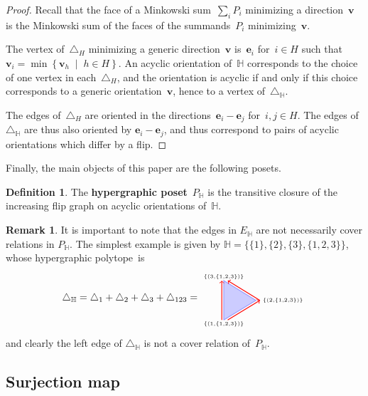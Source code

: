 \documentclass[reqno]{amsart}
\theoremstyle{definition}
\newtheorem{definition}[theorem]{Definition}
\newtheorem{remark}[theorem]{Remark}
\renewcommand{\b}[1]{\boldsymbol{#1}} %
\newcommand{\set}[2]{\left\{ #1 \;\middle|\; #2 \right\}} %
\newcommand{\simplex}{\triangle} %
\newcommand{\defn}[1]{\textbf{\textsf{\color{PineGreen} #1}}} %
\newcommand{\HH}{\mathbb H}  %
\begin{document}
\begin{proof}
Recall that the face of a Minkowski sum~$\sum_i P_i$ minimizing a direction~$\b{v}$ is the Minkowski sum of the faces of the summands~$P_i$ minimizing~$\b{v}$.

The vertex of~$\triangle_H$ minimizing a generic direction~$\b{v}$ is~$\b{e}_i$ for~$i \in H$ such that~$\b{v}_i = \min\set{\b{v}_h}{h \in H}$.
An acyclic orientation of~$\HH$ corresponds to the choice of one vertex in each~$\triangle_H$, and the orientation is acyclic if and only if this choice corresponds to a generic orientation~$\b{v}$, hence to a vertex of~$\triangle_\HH$.

The edges of~$\triangle_H$ are oriented in the directions~$\b{e}_i-\b{e}_j$ for~$i,j \in H$.
The edges of~$\triangle_\HH$ are thus also oriented by $\b{e}_i-\b{e}_j$, and thus correspond to pairs of acyclic orientations which differ by a flip.
\end{proof}

Finally, the main objects of this paper are the following posets.

\begin{definition}
The \defn{hypergraphic poset}~$P_\HH$ is the transitive closure of the increasing flip graph on acyclic orientations of~$\HH$.
\end{definition}

\begin{remark}
\label{rem:EdgeNotCover}
It is important to note that the edges in $E_\HH$ are not necessarily cover relations in $P_\HH$.
The simplest example is given by $\HH=\big\{\{1\},\{2\},\{3\},\{1,2,3\}\big\}$, whose hypergraphic polytope~is
\[
	\simplex_\HH=\simplex_1+\simplex_2+\simplex_3+\simplex_{123}=
	\begin{tikzpicture}[scale=.7,baseline=.0cm]
		\node (a) at (0,-1.2) {$\scriptscriptstyle \{(1,\{1,2,3\})\}$};
		\node (b) at (3,0) {$\scriptscriptstyle \{(2,\{1,2,3\})\}$};
		\node (c) at (0,1.2) {$\scriptscriptstyle \{(3,\{1,2,3\})\}$};
		\draw [color=blue!40,thick,fill=blue!20] (0,-1)--(0,1)--(1.632,0)--(0,-1) ; 
		\draw [color=red,thick,->] (-.1,-1)--(-.1,1); 
		\draw [color=red,thick,->] (1.832,0)--(.2,1); 
		\draw [color=red,thick,->] (.2,-1)--(1.832,0); 
	\end{tikzpicture}
\]
and clearly the left edge of $\triangle_\HH$ is not a cover relation of~$P_\HH$.
\end{remark}


\subsection{Surjection map} 
\label{subsec:surjection}
\end{document}
